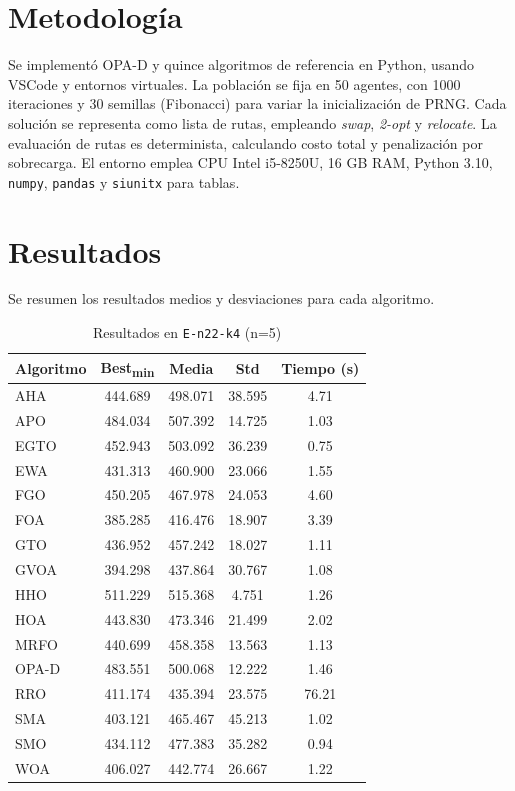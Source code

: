 \documentclass[conference]{IEEEtran}
\begin{document}
\section{Metodología}
Se implementó OPA-D y quince algoritmos de referencia en Python, usando VSCode y entornos virtuales. La población se fija en 50 agentes, con 1000 iteraciones y 30 semillas (Fibonacci) para variar la inicialización de PRNG. Cada solución se representa como lista de rutas, empleando \emph{swap}, \emph{2-opt} y \emph{relocate}. La evaluación de rutas es determinista, calculando costo total y penalización por sobrecarga. El entorno emplea CPU Intel i5-8250U, 16 GB RAM, Python 3.10, \texttt{numpy}, \texttt{pandas} y \texttt{siunitx} para tablas.

\section{Resultados}
Se resumen los resultados medios y desviaciones para cada algoritmo.

\begin{table}[ht]
  \centering
  \caption{Resultados en \texttt{E-n22-k4} (n=5)}
  \label{tab:results_e}
  \footnotesize
  \begin{tabular}{lS[table-format=3.3]S[table-format=3.3]S[table-format=2.3]S[table-format=2.2]}
    \toprule
    Algoritmo & {Best\textsubscript{min}} & {Media} & {Std} & {Tiempo (s)}\\
    \midrule
    AHA    & 444.689 & 498.071 & 38.595 & 4.71 \\
    APO    & 484.034 & 507.392 & 14.725 & 1.03 \\
    EGTO   & 452.943 & 503.092 & 36.239 & 0.75 \\
    EWA    & 431.313 & 460.900 & 23.066 & 1.55 \\
    FGO    & 450.205 & 467.978 & 24.053 & 4.60 \\
    FOA    & 385.285 & 416.476 & 18.907 & 3.39 \\
    GTO    & 436.952 & 457.242 & 18.027 & 1.11 \\
    GVOA   & 394.298 & 437.864 & 30.767 & 1.08 \\
    HHO    & 511.229 & 515.368 & 4.751  & 1.26 \\
    HOA    & 443.830 & 473.346 & 21.499 & 2.02 \\
    MRFO   & 440.699 & 458.358 & 13.563 & 1.13 \\
    OPA-D  & 483.551 & 500.068 & 12.222 & 1.46 \\
    RRO    & 411.174 & 435.394 & 23.575 & 76.21\\
    SMA    & 403.121 & 465.467 & 45.213 & 1.02 \\
    SMO    & 434.112 & 477.383 & 35.282 & 0.94 \\
    WOA    & 406.027 & 442.774 & 26.667 & 1.22 \\
    \bottomrule
  \end{tabular}
\end{table}
\end{document}

